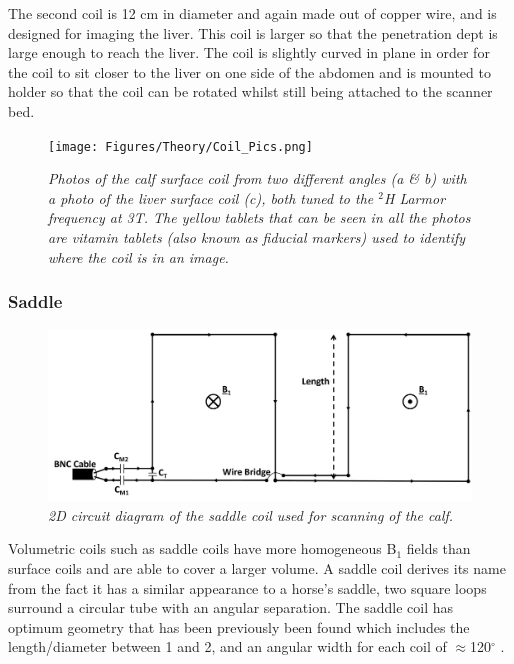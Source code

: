 The second coil is 12 cm in diameter and again made out of copper wire, and is designed for imaging the liver. This coil is larger so that the penetration dept is large enough to reach the liver. The coil is slightly curved in plane in order for the coil to sit closer to the liver on one side of the abdomen and is mounted to holder so that the coil can be rotated whilst still being attached to the scanner bed.

\begin{figure}
    \centering
    \texttt{[image: Figures/Theory/Coil\_Pics.png]}
    \caption{\textit{Photos of the calf surface coil from two different angles (a \& b) with a photo of the liver surface coil (c), both tuned to the $^2$H Larmor frequency at 3T. The yellow tablets that can be seen in all the photos are vitamin tablets (also known as fiducial markers) used to identify where the coil is in an image.}}
    \label{fig:theory:Pics}
\end{figure}

\subsubsection{Saddle}

\begin{figure}
    \centering
    \includegraphics[width=1\textwidth]{Figures/Theory/Planar_Saddle.png}
    \caption{\textit{2D circuit diagram of the saddle coil used for scanning of the calf.}}
    \label{fig:theory:2D_Saddle}
\end{figure}

Volumetric coils such as saddle coils have more homogeneous B$_1$ fields than surface coils and are able to cover a larger volume. A saddle coil derives its name from the fact it has a similar appearance to a horse's saddle, two square loops surround a circular tube with an angular separation. The saddle coil has optimum geometry that has been previously been found which includes the length/diameter between 1 and 2, and an angular width for each coil of $\approx$120$^\circ$ \cite{Ginsberg1970OptimumField,Salmon2006OptimizationImaging}.

